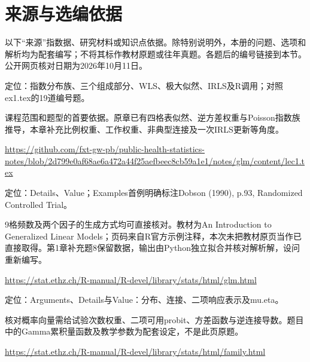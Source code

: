 \chapter*{来源与选编依据}
以下“来源”指数据、研究材料或知识点依据。除特别说明外，本册的问题、选项和解析均为配套编写；不将其标作教材原题或往年真题。各题后的编号链接到本节。公开网页核对日期为2026年10月11日。

\par\noindent\begin{minipage}{\linewidth}\raggedright{}\label{src:G1-NOTES}
\par
定位：指数分布族、三个组成部分、WLS、极大似然、IRLS及R调用；对照ex1.tex的19道编号题。\par
课程范围和题型的首要依据。原章已有四格表似然、逆方差权重与Poisson指数族推导，本章补充比例权重、工作权重、非典型连接及一次IRLS更新等角度。\par
{\small \url{https://github.com/fxt-gw-pb/public-health-statistics-notes/blob/2d799e0af68ae6a472a44f25aefbeec8cb59a1e1/notes/glm/content/lec1.tex}}\par
\end{minipage}\par\medskip

\par\noindent\begin{minipage}{\linewidth}\raggedright{}\label{src:G1-GLM}
\par
定位：Details、Value；Examples首例明确标注Dobson (1990), p.93, Randomized Controlled Trial。\par
9格频数及两个因子的生成方式均可直接核对。教材为An Introduction to Generalized Linear Models；页码来自R官方示例注释，本次未把教材原页当作已直接取得。第1章补充题8保留数据，输出由Python独立拟合并核对解析解，设问重新编写。\par
{\small \url{https://stat.ethz.ch/R-manual/R-devel/library/stats/html/glm.html}}\par
\end{minipage}\par\medskip

\par\noindent\begin{minipage}{\linewidth}\raggedright{}\label{src:G1-FAMILY}
\par
定位：Arguments、Details与Value：分布、连接、二项响应表示及mu.eta。\par
核对概率向量需给试验次数权重、二项可用probit、方差函数与逆连接导数。题目中的Gamma累积量函数及教学参数为配套设定，不是此页原题。\par
{\small \url{https://stat.ethz.ch/R-manual/R-devel/library/stats/html/family.html}}\par
\end{minipage}\par\medskip

